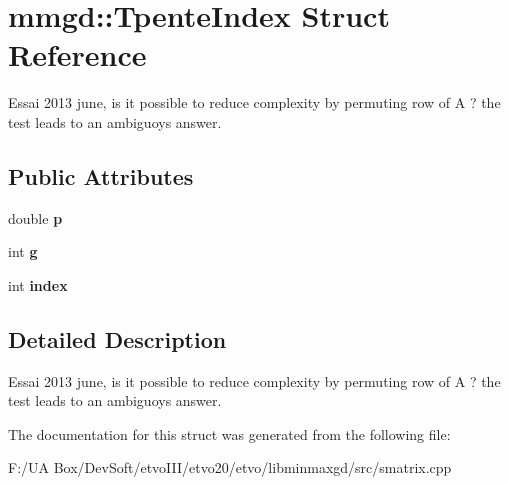 \section{mmgd\+:\+:Tpente\+Index Struct Reference}
\label{structmmgd_1_1_tpente_index}


Essai 2013 june, is it possible to reduce complexity by permuting row of A ? the test leads to an ambiguoys answer.  


\subsection*{Public Attributes}
\begin{DoxyCompactItemize}
\item 
\mbox{\label{structmmgd_1_1_tpente_index_a315a18a31fbc3461177a78772697ae04}} 
double {\bfseries p}
\item 
\mbox{\label{structmmgd_1_1_tpente_index_a850289e8fa3c9bc54639af8708b09acb}} 
int {\bfseries g}
\item 
\mbox{\label{structmmgd_1_1_tpente_index_a5970abc4c5a0098b19f21ea8e7cfcdfe}} 
int {\bfseries index}
\end{DoxyCompactItemize}


\subsection{Detailed Description}
Essai 2013 june, is it possible to reduce complexity by permuting row of A ? the test leads to an ambiguoys answer. 

The documentation for this struct was generated from the following file\+:\begin{DoxyCompactItemize}
\item 
F\+:/\+U\+A Box/\+Dev\+Soft/etvo\+I\+I\+I/etvo20/etvo/libminmaxgd/src/smatrix.\+cpp\end{DoxyCompactItemize}
